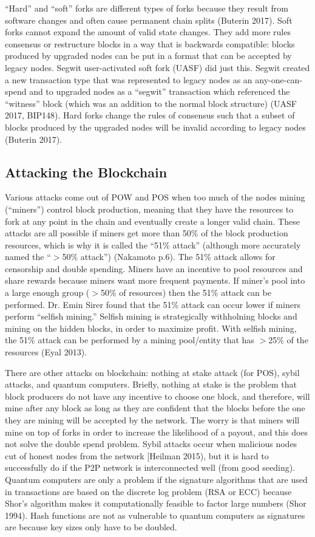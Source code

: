 \documentclass[letterpaper, 10 pt, conference]{ieeeconf}  %
\begin{document}
“Hard” and “soft” forks are different types of forks because they result from software changes and often cause permanent chain splits (Buterin 2017). Soft forks cannot expand the amount of valid state changes. They add more rules consensus or restructure blocks in a way that is backwards compatible: blocks produced by upgraded nodes can be put in a format that can be accepted by legacy nodes. Segwit user-activated soft fork (UASF) did just this. Segwit created a new transaction type that was represented to legacy nodes as an any-one-can-spend and to upgraded nodes as a “segwit” transaction which referenced the “witness” block (which was an addition to the normal block structure) (UASF 2017, BIP148). Hard forks change the rules of consensus such that a subset of blocks produced by the upgraded nodes will be invalid according to legacy nodes (Buterin 2017). 

\subsection{Attacking the Blockchain}
Various attacks come out of POW and POS when too much of the nodes mining (“miners”) control block production, meaning that they have the resources to fork at any point in the chain and eventually create a longer valid chain. These attacks are all possible if miners get more than 50\% of the block production resources, which is why it is called the “51\% attack” (although more accurately named the “$>$50\% attack”) (Nakamoto p.6). The 51\% attack allows for censorship and double spending. Miners have an incentive to pool resources and share rewards because miners want more frequent payments. If miner’s pool into a large enough group ($>$50\% of resources) then the 51\% attack can be performed. Dr. Emin Sirer found that the 51\% attack can occur lower if miners perform “selfish mining.” Selfish mining is strategically withholning blocks and mining on the hidden blocks, in order to maximize profit. With selfish mining, the 51\% attack can be performed by a mining pool/entity that has $>$25\% of the resources (Eyal 2013).

There are other attacks on blockchain: nothing at stake attack (for POS), sybil attacks, and quantum computers. Briefly, nothing at stake is the problem that block producers do not have any incentive to choose one block, and therefore, will mine after any block as long as they are confident that the blocks before the one they are mining will be accepted by the network. The worry is that miners will mine on top of forks in order to increase the likelihood of a payout, and this does not solve the double spend problem. Sybil attacks occur when malicious nodes cut of honest nodes from the network [Heilman 2015), but it is hard to successfully do if the P2P network is interconnected well (from good seeding). Quantum computers are only a problem if the signature algorithms that are used in transactions are based on the discrete log problem (RSA or ECC) because Shor’s algorithm makes it computationally feasible to factor large numbers (Shor 1994). Hash functions are not as vulnerable to quantum computers as signatures are because key sizes only have to be doubled. 
\end{document}
